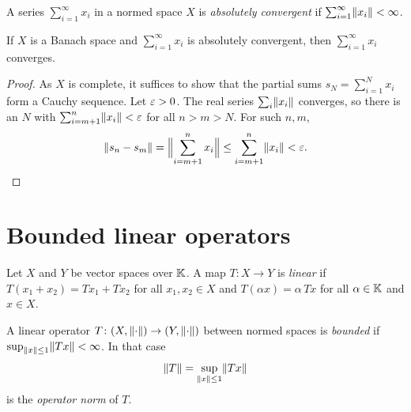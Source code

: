 \begin{definition}\label{def:abs-conv}
A series $\sum_{i=1}^{\infty} x_i$ in a normed space $X$ is
\emph{absolutely convergent} if $\sum_{i=1}^{\infty} \lVert x_i\rVert < \infty$.
\end{definition}

\begin{lemma}\label{lem:abs-conv}
If $X$ is a Banach space and $\sum_{i=1}^{\infty} x_i$ is absolutely
convergent, then $\sum_{i=1}^{\infty} x_i$ converges.
\end{lemma}

\begin{proof}
As $X$ is complete, it suffices to show that the partial sums
$s_N = \sum_{i=1}^{N} x_i$ form a Cauchy sequence. Let $\varepsilon > 0$. The real
series $\sum_i \lVert x_i\rVert$ converges, so there is an $N$ with
$\sum_{i=m+1}^{n} \lVert x_i\rVert < \varepsilon$ for all $n > m > N$. For such $n, m$,
\[
  \lVert s_n - s_m\rVert = \Bigl\lVert \sum_{i=m+1}^{n} x_i \Bigr\rVert
  \le \sum_{i=m+1}^{n} \lVert x_i\rVert < \varepsilon . \qedhere
\]
\end{proof}

\section{Bounded linear operators}

\begin{definition}\label{def:linear-op}
Let $X$ and $Y$ be vector spaces over $\mathbb{K}$. A map $T \colon X \to Y$ is
\emph{linear} if $T(x_1 + x_2) = Tx_1 + Tx_2$ for all $x_1, x_2 \in X$ and
$T(\alpha x) = \alpha\, Tx$ for all $\alpha \in \mathbb{K}$ and $x \in X$.
\end{definition}

\begin{definition}\label{def:bounded-op}
A linear operator $T \colon (X, \lVert\cdot\rVert) \to (Y, \lVert\cdot\rVert)$ between
normed spaces is \emph{bounded} if
$\sup_{\lVert x\rVert \le 1} \lVert Tx\rVert < \infty$. In that case
\[
  \lVert T\rVert = \sup_{\lVert x\rVert \le 1} \lVert Tx\rVert
\]
is the \emph{operator norm} of $T$.
\end{definition}

